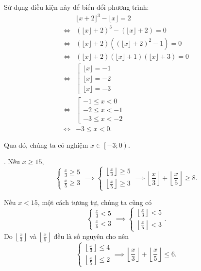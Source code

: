 Sử dụng điều kiện này để biến đổi phương trình:
\begin{align*}
   &\lfloor x + 2 \rfloor^3 - \lfloor x \rfloor = 2\\
   \iff &\left(\lfloor x \rfloor + 2\right)^3 - \left(\lfloor x \rfloor + 2\right) = 0 \\
   \iff &\left(\lfloor x \rfloor + 2\right)\left(\left(\lfloor x \rfloor + 2\right)^2 - 1\right) = 0 \\
   \iff &\left(\lfloor x \rfloor + 2\right)\left(\lfloor x \rfloor + 1\right)\left(\lfloor x \rfloor + 3\right) = 0 \\
   \iff &\left[\begin{array}{l}
      \lfloor x \rfloor = -1 \\
      \lfloor x \rfloor = -2 \\
      \lfloor x \rfloor = -3
   \end{array}\right. \\
   \iff &\left[\begin{array}{l}
      -1 \leq x < 0 \\
      -2 \leq x < -1 \\
      -3 \leq x < -2
   \end{array}\right. \\
   \iff & -3 \leq x < 0.
\end{align*}

Qua đó, chúng ta có nghiệm $x \in \left[-3; 0\right)$.

. Nếu $x \geq 15$, $$\begin{cases}
   \frac{x}{3} \geq 5 \\
   \frac{x}{5} \geq 3
\end{cases} \implies \begin{cases}
   \left\lfloor \frac{x}{3} \right\rfloor \geq 5 \\
   \left\lfloor \frac{x}{5} \right\rfloor \geq 3
\end{cases} \implies \left\lfloor \frac{x}{3} \right\rfloor + \left\lfloor \frac{x}{5} \right\rfloor \geq 8.$$

Nếu $x < 15$, một cách tương tự, chúng ta cũng có
\begin{equation*}
   \begin{cases}
      \frac{x}{3} < 5 \\
      \frac{x}{5} < 3
   \end{cases} \implies \begin{cases}
      \left\lfloor \frac{x}{3} \right\rfloor < 5 \\
      \left\lfloor \frac{x}{5} \right\rfloor < 3
   \end{cases}.
\end{equation*}
Do $\left\lfloor \frac{x}{3} \right\rfloor$ và $\left\lfloor \frac{x}{5} \right\rfloor$ đều là số nguyên cho nên
$$
\begin{cases}
   \left\lfloor \frac{x}{3} \right\rfloor \leq 4 \\
   \left\lfloor \frac{x}{5} \right\rfloor \leq 2
\end{cases} \implies \left\lfloor \frac{x}{3} \right\rfloor + \left\lfloor \frac{x}{5} \right\rfloor \leq 6.
$$

